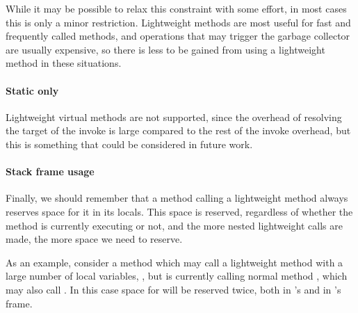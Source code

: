 While it may be possible to relax this constraint with some effort, in most cases this is only a minor restriction. Lightweight methods are most useful for fast and frequently called methods, and operations that may trigger the garbage collector are usually expensive, so there is less to be gained from using a lightweight method in these situations.

\paragraph{Static only}
Lightweight virtual methods are not supported, since the overhead of resolving the target of the invoke is large compared to the rest of the invoke overhead, but this is something that could be considered in future work.

\paragraph{Stack frame usage}
Finally, we should remember that a method calling a lightweight method always reserves space for it in its locals. This space is reserved, regardless of whether the method is currently executing or not, and the more nested lightweight calls are made, the more space we need to reserve.

As an example, consider a method  which may call a lightweight method with a large number of local variables, , but is currently calling normal method , which may also call . In this case space for  will be reserved twice, both in 's and in 's frame.

